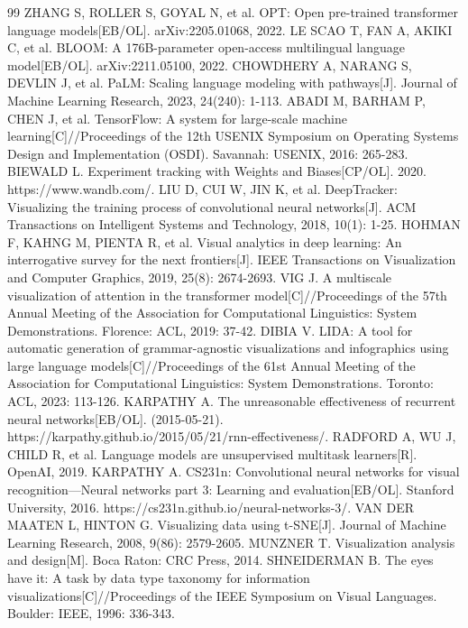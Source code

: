 \begin{thebibliography}{99}
 ZHANG S, ROLLER S, GOYAL N, et al. OPT: Open pre-trained transformer language models[EB/OL]. arXiv:2205.01068, 2022.
 LE SCAO T, FAN A, AKIKI C, et al. BLOOM: A 176B-parameter open-access multilingual language model[EB/OL]. arXiv:2211.05100, 2022.
 CHOWDHERY A, NARANG S, DEVLIN J, et al. PaLM: Scaling language modeling with pathways[J]. Journal of Machine Learning Research, 2023, 24(240): 1-113.
 ABADI M, BARHAM P, CHEN J, et al. TensorFlow: A system for large-scale machine learning[C]//Proceedings of the 12th USENIX Symposium on Operating Systems Design and Implementation (OSDI). Savannah: USENIX, 2016: 265-283.
 BIEWALD L. Experiment tracking with Weights and Biases[CP/OL]. 2020. https://www.wandb.com/.
 LIU D, CUI W, JIN K, et al. DeepTracker: Visualizing the training process of convolutional neural networks[J]. ACM Transactions on Intelligent Systems and Technology, 2018, 10(1): 1-25.
 HOHMAN F, KAHNG M, PIENTA R, et al. Visual analytics in deep learning: An interrogative survey for the next frontiers[J]. IEEE Transactions on Visualization and Computer Graphics, 2019, 25(8): 2674-2693.
 VIG J. A multiscale visualization of attention in the transformer model[C]//Proceedings of the 57th Annual Meeting of the Association for Computational Linguistics: System Demonstrations. Florence: ACL, 2019: 37-42.
 DIBIA V. LIDA: A tool for automatic generation of grammar-agnostic visualizations and infographics using large language models[C]//Proceedings of the 61st Annual Meeting of the Association for Computational Linguistics: System Demonstrations. Toronto: ACL, 2023: 113-126.
 KARPATHY A. The unreasonable effectiveness of recurrent neural networks[EB/OL]. (2015-05-21). https://karpathy.github.io/2015/05/21/rnn-effectiveness/.
 RADFORD A, WU J, CHILD R, et al. Language models are unsupervised multitask learners[R]. OpenAI, 2019.
 KARPATHY A. CS231n: Convolutional neural networks for visual recognition—Neural networks part 3: Learning and evaluation[EB/OL]. Stanford University, 2016. https://cs231n.github.io/neural-networks-3/.
 VAN DER MAATEN L, HINTON G. Visualizing data using t-SNE[J]. Journal of Machine Learning Research, 2008, 9(86): 2579-2605.
 MUNZNER T. Visualization analysis and design[M]. Boca Raton: CRC Press, 2014.
 SHNEIDERMAN B. The eyes have it: A task by data type taxonomy for information visualizations[C]//Proceedings of the IEEE Symposium on Visual Languages. Boulder: IEEE, 1996: 336-343.

\end{thebibliography}
